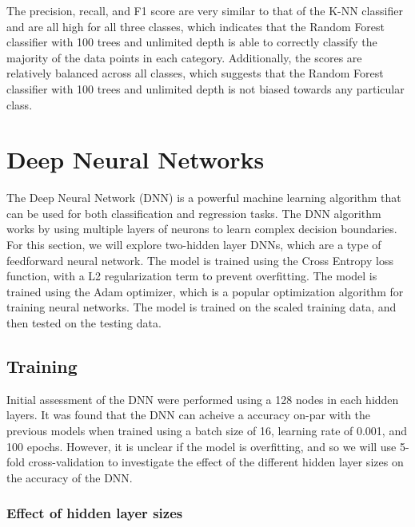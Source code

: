 \documentclass[12pt]{article}
\begin{document}
The precision, recall, and F1 score are very similar to that of the K-NN classifier and are all high for all three classes, which indicates that the Random Forest classifier with 100 trees and unlimited depth is able to correctly classify the majority of the data points in each category. Additionally, the scores are relatively balanced across all classes, which suggests that the Random Forest classifier with 100 trees and unlimited depth is not biased towards any particular class.

\vspace{20pt}

\section{Deep Neural Networks}
\noindent
The Deep Neural Network (DNN) is a powerful machine learning algorithm that can be used for both classification and regression tasks. The DNN algorithm works by using multiple layers of neurons to learn complex decision boundaries. For this section, we will explore two-hidden layer DNNs, which are a type of feedforward neural network. The model is trained using the Cross Entropy loss function, with a L2 regularization term to prevent overfitting. The model is trained using the Adam optimizer, which is a popular optimization algorithm for training neural networks. The model is trained on the scaled training data, and then tested on the testing data.

\vspace{20pt}

\subsection{Training}
\noindent
Initial assessment of the DNN were performed using a 128 nodes in each hidden layers. It was found that the DNN can acheive a accuracy on-par with the previous models when trained using a batch size of 16, learning rate of 0.001, and 100 epochs. However, it is unclear if the model is overfitting, and so we will use 5-fold cross-validation to investigate the effect of the different hidden layer sizes on the accuracy of the DNN.

\subsubsection{Effect of hidden layer sizes}
\noindent
\end{document}
